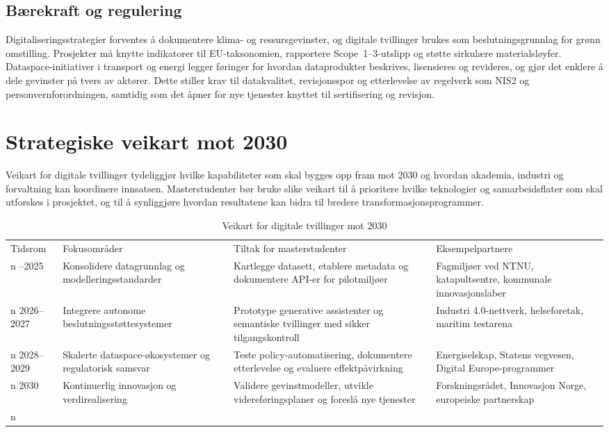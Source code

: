 \subsection{Bærekraft og regulering}
Digitaliseringsstrategier forventes å dokumentere klima- og ressursgevinster, og digitale tvillinger brukes som beslutningsgrunnlag for grønn omstilling. Prosjekter må knytte indikatorer til EU-taksonomien, rapportere Scope~1--3-utslipp og støtte sirkulære materialsløyfer. Dataspace-initiativer i transport og energi legger føringer for hvordan dataprodukter beskrives, lisensieres og revideres, og gjør det enklere å dele gevinster på tvers av aktører.\citep{ec2023mobilitydataspace} Dette stiller krav til datakvalitet, revisjonsspor og etterlevelse av regelverk som NIS2 og personvernforordningen, samtidig som det åpner for nye tjenester knyttet til sertifisering og revisjon.

\section{Strategiske veikart mot 2030}
Veikart for digitale tvillinger tydeliggjør hvilke kapabiliteter som skal bygges opp fram mot 2030 og hvordan akademia, industri og forvaltning kan koordinere innsatsen.\citep{rcn2023veikart,eu2024digitaltwinroadmap} Masterstudenter bør bruke slike veikart til å prioritere hvilke teknologier og samarbeidsflater som skal utforskes i prosjektet, og til å synliggjøre hvordan resultatene kan bidra til bredere transformasjonsprogrammer.

\begin{table}[h]
    \centering
    \caption{Veikart for digitale tvillinger mot 2030}
    \label{tab:roadmap2030}
    \begin{tabular}{p{2.4cm}p{4.1cm}p{4.1cm}p{3.0cm}}
        \toprule
        Tidsrom & Fokusområder & Tiltak for masterstudenter & Eksempelpartnere \\n        \midrule
        2024--2025 & Konsolidere datagrunnlag og modelleringsstandarder & Kartlegge datasett, etablere metadata og dokumentere API-er for pilotmiljøer & Fagmiljøer ved NTNU, katapultsentre, kommunale innovasjonslaber \\n        2026--2027 & Integrere autonome beslutningsstøttesystemer & Prototype generative assistenter og semantiske tvillinger med sikker tilgangskontroll & Industri 4.0-nettverk, helseforetak, maritim testarena \\n        2028--2029 & Skalerte dataspace-økosystemer og regulatorisk samsvar & Teste policy-automatisering, dokumentere etterlevelse og evaluere effektpåvirkning & Energiselskap, Statens vegvesen, Digital Europe-programmer \\n        2030 & Kontinuerlig innovasjon og verdirealisering & Validere gevinstmodeller, utvikle videreføringsplaner og foreslå nye tjenester & Forskningsrådet, Innovasjon Norge, europeiske partnerskap \\n        \bottomrule
    \end{tabular}
\end{table}


